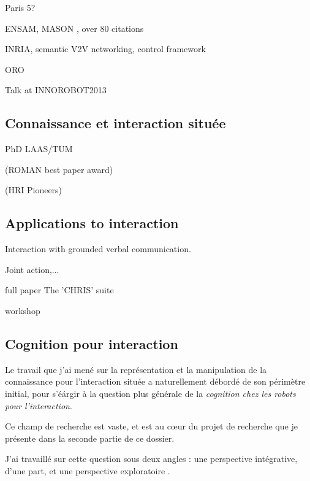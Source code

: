 \documentclass[a4paper]{article}
\begin{document}
Paris 5?

ENSAM, MASON
\cite{lemaignan2006mason}, over 80 citations

INRIA, semantic V2V networking, control framework
\cite{mehani2007networking}

\cite{Lemaignan2010} ORO

Talk at INNOROBOT2013

\cite{lemaignan2013explicit}


\subsection{Connaissance et interaction située%
  \label{semantic-tools-for-grounded-interaction}%
}

PhD LAAS/TUM

\cite{ros2010which} (ROMAN best paper award)

\cite{Lemaignan2011} (HRI Pioneers)


\subsection{Applications to interaction%
  \label{applications-to-interaction}%
}

Interaction with grounded verbal communication.

\cite{Lemaignan2011a}

\cite{Ros2010a}
\cite{lemaignan2011what}
\cite{lemaignan2011dialogue}
\cite{lemaignan2013talking}

Joint action,...

full paper
The 'CHRIS' suite
\cite{Lallee2010b, Lallee2011, Lallee2012}

workshop
\cite{gharbi2013natural}
\cite{clodic2013on}

\subsection{Cognition pour interaction%
  \label{cognition-for-interaction}%
}

Le travail que j'ai mené sur la représentation et la manipulation de la
connaissance pour l'interaction située a naturellement débordé de son périmètre
initial, pour s'éárgir à la question plus générale de la \emph{cognition chez
les robots pour l'interaction}.

Ce champ de recherche est vaste, et est au c\oe ur du projet de recherche que je
présente dans la seconde partie de ce dossier.

J'ai travaillé sur cette question sous deux angles : une perspective
intégrative, d'une part, et une perspective exploratoire .
\end{document}
